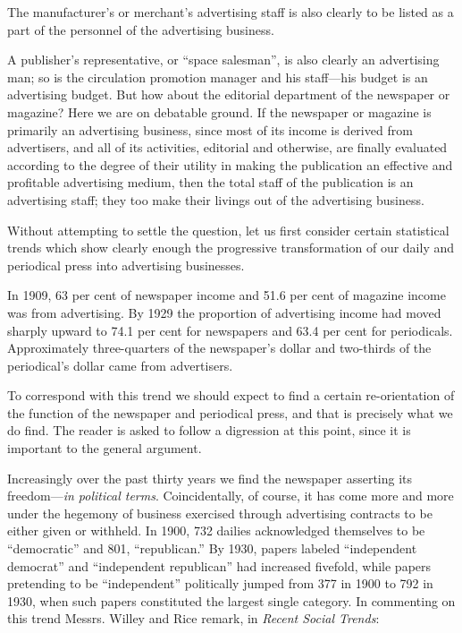 \documentclass[openany,nobib]{tufte-book}
\begin{document}
The manufacturer's or merchant's advertising staff is also clearly to be
listed as a part of the personnel of the advertising business.

A publisher's representative, or ``space salesman'', is also clearly an
advertising man; so is the circulation promotion manager and his
staff---his budget is an advertising budget. But how about the editorial
department of the newspaper or magazine? Here we are on debatable
ground. If the newspaper or magazine is primarily an advertising
business, since most of its income is derived from advertisers, and all
of its activities, editorial and otherwise, are finally evaluated
according to the degree of their utility in making the publication an
effective and profitable advertising medium, then the total staff of the
publication is an advertising staff; they too make their livings out of
the advertising business.

Without attempting to settle the question, let us first consider certain
statistical trends which show clearly enough the progressive
transformation of our daily and periodical press into advertising
businesses.

In 1909, 63 per cent of newspaper income and 51.6 per cent of magazine
income was from advertising. By 1929 the proportion of advertising
income had moved sharply upward to 74.1 per cent for newspapers and 63.4
per cent for periodicals. Approximately three-quarters of the
newspaper's dollar and two-thirds of the periodical's dollar came from
advertisers.

To correspond with this trend we should expect to find a certain
re-orientation of the function of the newspaper and periodical press,
and that is precisely what we do find. The reader is asked to follow a
digression at this point, since it is important to the general argument.

Increasingly over the past thirty years we find the newspaper asserting
its freedom---\emph{in political terms}. Coincidentally, of course, it
has come more and more under the hegemony of business exercised through
advertising contracts to be either given or withheld. In 1900, 732
dailies acknowledged themselves to be ``democratic'' and 801,
``republican.'' By 1930, papers labeled ``independent democrat'' and
``independent republican'' had increased fivefold, while papers
pretending to be ``independent'' politically jumped from 377 in 1900 to
792 in 1930, when such papers constituted the largest single category.
In commenting on this trend Messrs. Willey and Rice remark, in
\emph{Recent Social Trends}:
\end{document}
